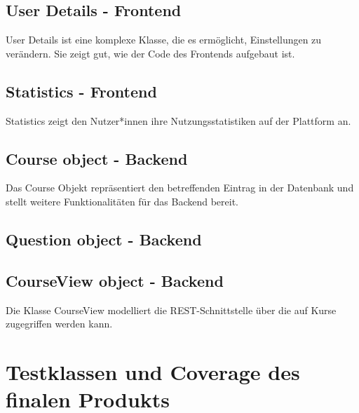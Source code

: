 \documentclass[accentcolor=tud0b,12pt,paper=a4]{tudreport}
\begin{document}
	

	\section*{User Details - Frontend}
	User Details ist eine komplexe Klasse, die es ermöglicht, Einstellungen zu verändern. Sie zeigt gut, wie der Code des Frontends aufgebaut ist.

	

	\section*{Statistics - Frontend}
	Statistics zeigt den Nutzer*innen ihre Nutzungsstatistiken auf der Plattform an. 

	

	\section*{Course object - Backend}
	Das Course Objekt repräsentiert den betreffenden Eintrag in der Datenbank und stellt weitere Funktionalitäten für das Backend bereit.

	

	\section*{Question object - Backend} 

	

	\section*{CourseView object - Backend}
	Die Klasse CourseView modelliert die REST-Schnittstelle über die auf Kurse zugegriffen werden kann.

	

\chapter{Testklassen und Coverage des finalen Produkts}
\end{document}
